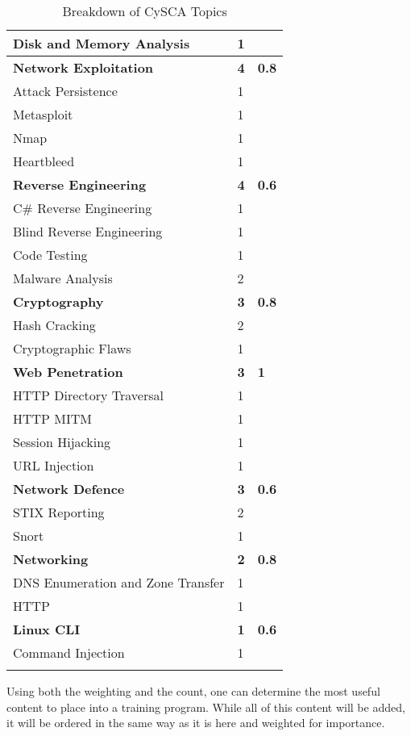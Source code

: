 \documentclass[a4paper,11pt]{report}
\begin{document}
\begin{center}
\begin{longtable}{| l | l | l |}
				\quad Disk and Memory Analysis & 1 & \\ \hline 
				\textbf{Network Exploitation} & \textbf{4} & \textbf{0.8} \\ \hline 
				\quad Attack Persistence & 1 & \\ \hline 
				\quad Metasploit & 1 & \\ \hline 
				\quad Nmap & 1 & \\ \hline 
				\quad Heartbleed & 1 & \\ \hline
				\textbf{Reverse Engineering} & \textbf{4} & \textbf{0.6}\\ \hline 
				\quad C\# Reverse Engineering & 1 & \\ \hline
				\quad Blind Reverse Engineering & 1 & \\ \hline 
				\quad Code Testing & 1 & \\ \hline 
				\quad Malware Analysis & 2 & \\ \hline
				\textbf{Cryptography} & \textbf{3} & \textbf{0.8} \\ \hline 
				\quad Hash Cracking & 2 & \\ \hline
				\quad Cryptographic Flaws & 1 & \\ \hline 
				\textbf{Web Penetration} & \textbf{3} & \textbf{1} \\ \hline
				\quad HTTP Directory Traversal & 1 & \\ \hline
				\quad HTTP MITM & 1 & \\ \hline
				\quad Session Hijacking & 1 & \\ \hline
				\quad URL Injection & 1 & \\ \hline
				\textbf{Network Defence} & \textbf{3} & \textbf{0.6} \\ \hline
				\quad STIX Reporting & 2 & \\ \hline
				\quad Snort & 1 & \\ \hline
				\textbf{Networking} & \textbf{2} & \textbf{0.8}\\ \hline
				\quad DNS Enumeration and Zone Transfer & 1 & \\ \hline 
				\quad HTTP & 1 & \\ \hline 
				\textbf{Linux CLI} & \textbf{1} &\textbf{0.6} \\ \hline
				\quad Command Injection & 1 & \\ \hline 
				\noalign{\vskip 0.5cm}
				\caption{\label{tab:CySCABreakdown}Breakdown of CySCA Topics}
				\vspace{-1.3cm}
			\end{longtable}
		\end{center}
		Using both the weighting and the count, one can determine the most useful content to place into a training program. 
		While all of this content will be added, it will be ordered in the same way as it is here and weighted for importance. 
\end{document}
